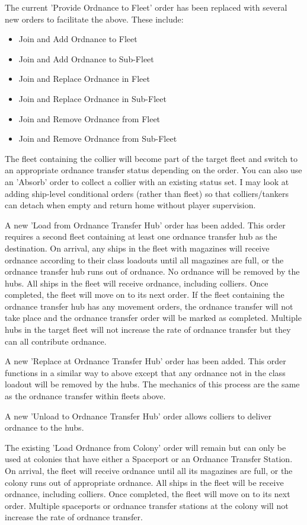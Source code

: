 \documentclass[../../Aurora C# unofficial manual.tex]{subfiles}
\begin{document}
	The current 'Provide Ordnance to Fleet' order has been replaced with several new orders to facilitate the above. These include:
	\begin{itemize}
		\item Join and Add Ordnance to Fleet
		\item Join and Add Ordnance to Sub-Fleet
		\item Join and Replace Ordnance in Fleet
		\item Join and Replace Ordnance in Sub-Fleet
		\item Join and Remove Ordnance from Fleet
		\item Join and Remove Ordnance from Sub-Fleet
	\end{itemize}
	
	The fleet containing the collier will become part of the target fleet and switch to an appropriate ordnance transfer status depending on the order. You can also use an 'Absorb' order to collect a collier with an existing status set. I may look at adding ship-level conditional orders (rather than fleet) so that colliers/tankers can detach when empty and return home without player supervision.
	
	A new 'Load from Ordnance Transfer Hub' order has been added. This order requires a second fleet containing at least one ordnance transfer hub as the destination. On arrival, any ships in the fleet with magazines will receive ordnance according to their class loadouts until all magazines are full, or the ordnance transfer hub runs out of ordnance. No ordnance will be removed by the hubs. All ships in the fleet will receive ordnance, including colliers. Once completed, the fleet will move on to its next order. If the fleet containing the ordnance transfer hub has any movement orders, the ordnance transfer will not take place and the ordnance transfer order will be marked as completed. Multiple hubs in the target fleet will not increase the rate of ordnance transfer but they can all contribute ordnance.
	
	A new 'Replace at Ordnance Transfer Hub' order has been added. This order functions in a similar way to above except that any ordnance not in the class loadout will be removed by the hubs. The mechanics of this process are the same as the ordnance transfer within fleets above.
	
	A new 'Unload to Ordnance Transfer Hub' order allows colliers to deliver ordnance to the hubs.
	
	The existing 'Load Ordnance from Colony' order will remain but can only be used at colonies that have either a Spaceport or an Ordnance Transfer Station. On arrival, the fleet will receive ordnance until all its magazines are full, or the colony runs out of appropriate ordnance. All ships in the fleet will be receive ordnance, including colliers. Once completed, the fleet will move on to its next order. Multiple spaceports or ordnance transfer stations at the colony will not increase the rate of ordnance transfer.
	
\end{document}

